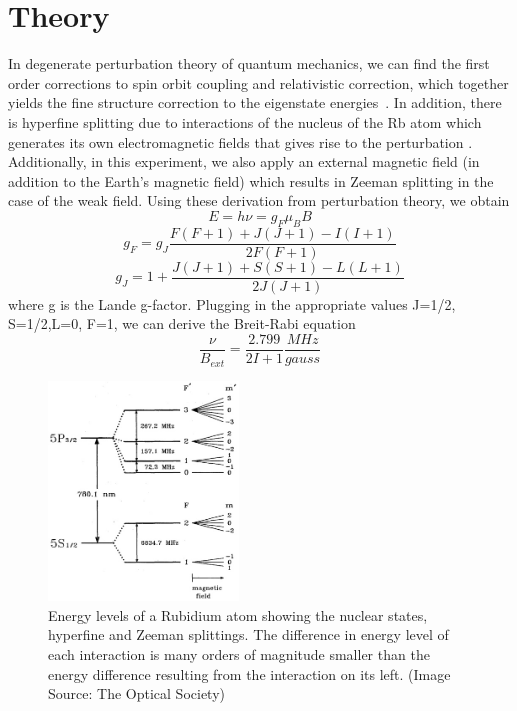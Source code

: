 \documentclass{sigchi}
\begin{document}
\section{Theory}\label{sec:theory}
\par In degenerate perturbation theory of quantum mechanics, we can find the first order corrections to spin orbit coupling and relativistic correction, which together yields the fine structure correction to the eigenstate energies~\cite{opt2}. In addition, there is hyperfine splitting due to interactions of the nucleus of the Rb atom which generates its own electromagnetic fields that gives rise to the perturbation \cite{wiki_hyperfine}.  Additionally, in this experiment, we also apply an external magnetic field (in addition to the Earth's magnetic field) which results in Zeeman splitting in the case of the weak field. Using these derivation from perturbation theory, we obtain 
$$E = h\nu = g_F \mu_B B$$
$$g_F = g_J \frac{F(F+1)+J(J+1)-I(I+1)}{2F(F+1)}$$
$$g_J = 1+\frac{J(J+1)+S(S+1)-L(L+1)}{2J(J+1)}$$
where g is the Lande g-factor. Plugging in the appropriate values J=1/2, S=1/2,L=0,  F=1, we can derive the Breit-Rabi equation 
\begin{equation}
\label{br}
\frac{\nu}{B_{ext}}=\frac{2.799}{2I+1} \frac{MHz}{gauss}
\end{equation}
\begin{figure}[h]
\includegraphics[width=0.45\textwidth]{plots/splitting_diagram.jpeg}
\caption{Energy levels of a Rubidium atom showing the nuclear states, hyperfine and Zeeman splittings. The difference in energy level of each interaction is many orders of magnitude smaller than the energy difference resulting from the interaction on its left. (Image Source: The Optical Society)}
\label{splitting}
\end{figure}
\end{document}
